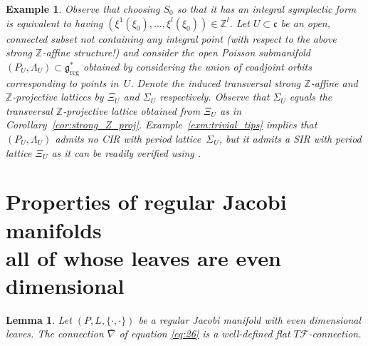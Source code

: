 \documentclass[10pt,a4paper]{amsart}
\numberwithin{equation}{section}
\newtheorem{Lemma}[Theorem]{Lemma}
\newtheorem{Example}[Theorem]{Example}
\newcommand{\ZZ}{\mathbb{Z}}
\begin{document}
\begin{Example}
Observe that choosing $S_0$ so that it has an integral symplectic form is equivalent to having $\left(\xi^1(\xi_0),\ldots, \xi^l(\xi_0)\right) \in \ZZ^l$. Let $U \subset \mathfrak{c}$ be an open, connected subset not containing any integral point (with respect to the above strong $\ZZ$-af\/f\/ine structure!) and consider the open Poisson submanifold $(P_U,\Lambda_U) \subset \mathfrak{g}^*_{\mathrm{reg}}$ obtained by considering the union of coadjoint orbits corresponding to points in~$U$. Denote the induced transversal strong $\ZZ$-af\/f\/ine and $\ZZ$-projective lattices by $\Xi_U$ and $\Sigma_U$ respectively. Observe that $\Sigma_U$ equals the transversal $\ZZ$-projective lattice obtained from $\Xi_U$ as in Corollary~\ref{cor:strong_Z_proj}. Example~\ref{exm:trivial_tips} implies that $\left(P_U,\Lambda_U\right)$ admits no CIR with period lattice~$\Sigma_U$, but it admits a SIR with period lattice $\Xi_U$ as it can be readily verif\/ied using \cite[Section~4]{dd}.
\end{Example}

\appendix
\section[Properties of regular Jacobi manifolds all of whose leaves are even dimensional]{Properties of regular Jacobi manifolds\\ all of whose leaves are even dimensional}\label{sec:proofs-prop-regul}

\begin{Lemma}\label{prop:well-defined} Let $(P,L,\{\cdot, \cdot\})$ be a regular Jacobi manifold with even dimensional leaves. The connection $\bar\nabla$ of equation \eqref{eq:26} is a well-defined flat $T \mathcal{F}$-connection.
\end{Lemma}
\end{document}
